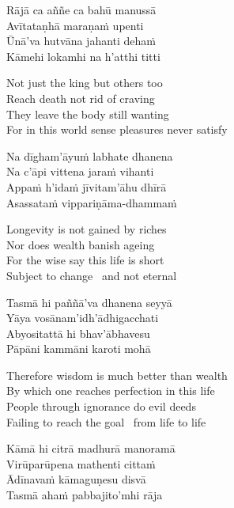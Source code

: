 \begin{verses}
  Rājā ca aññe ca bahū manussā\\
  Avītataṇhā maraṇaṁ upenti\\
  Ūnā'va hutvāna jahanti dehaṁ\\
  Kāmehi lokamhi na h'atthi titti
\end{verses}

\begin{english-verses}
  Not just the king but others too\\
  Reach death not rid of craving\\
  They leave the body still wanting\\
  For in this world sense pleasures never satisfy
\end{english-verses}

\begin{verses}
  Na dīgham'āyuṁ labhate dhanena\\
  Na c'āpi vittena jaraṁ vihanti\\
  Appaṁ h'idaṁ jīvitam'āhu dhīrā\\
  Asassataṁ vippariṇāma-dhammaṁ
\end{verses}

\begin{english-verses}
  Longevity is not gained by riches\\
  Nor does wealth banish ageing\\
  For the wise say this life is short\\
  Subject to change \breathmark\ and not eternal
\end{english-verses}

\begin{verses}
  Tasmā hi paññā'va dhanena seyyā\\
  Yāya vosānam'idh'ādhigacchati\\
  Abyositattā hi bhav'ābhavesu\\
  Pāpāni kammāni karoti mohā
\end{verses}

\begin{english-verses}
  Therefore wisdom is much better than wealth\\
  By which one reaches perfection in this life\\
  People through ignorance do evil deeds\\
  Failing to reach the goal \breathmark\ from life to life
\end{english-verses}

\begin{verses}
  Kāmā hi citrā madhurā manoramā\\
  Virūparūpena mathenti cittaṁ\\
  Ādīnavaṁ kāmaguṇesu disvā\\
  Tasmā ahaṁ pabbajito'mhi rāja
\end{verses}

